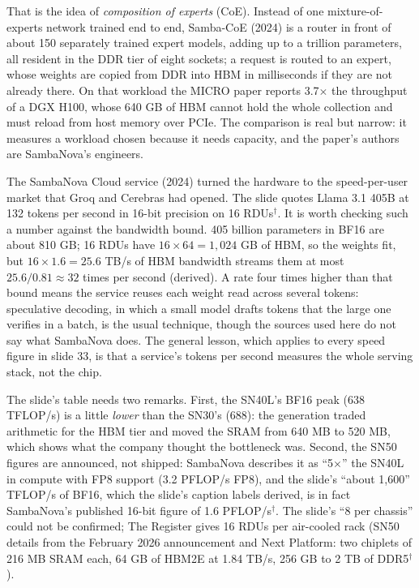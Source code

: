\documentclass[11pt,letterpaper]{article}
\begin{document}
That is the idea of \emph{composition of experts} (CoE). Instead of one mixture-of-experts network trained end to end, Samba-CoE (2024) is a router in front of about 150 separately trained expert models, adding up to a trillion parameters, all resident in the DDR tier of eight sockets; a request is routed to an expert, whose weights are copied from DDR into HBM in milliseconds if they are not already there. On that workload the MICRO paper reports 3.7$\times$ the throughput of a DGX H100, whose 640 GB of HBM cannot hold the whole collection and must reload from host memory over PCIe. The comparison is real but narrow: it measures a workload chosen because it needs capacity, and the paper's authors are SambaNova's engineers.

The SambaNova Cloud service (2024) turned the hardware to the speed-per-user market that Groq and Cerebras had opened. The slide quotes Llama 3.1 405B at 132 tokens per second in 16-bit precision on 16 RDUs$^\dagger$. It is worth checking such a number against the bandwidth bound. 405 billion parameters in BF16 are about 810 GB; 16 RDUs have $16\times 64 = 1{,}024$ GB of HBM, so the weights fit, but $16\times 1.6 = 25.6$ TB/s of HBM bandwidth streams them at most $25.6/0.81\approx 32$ times per second (derived). A rate four times higher than that bound means the service reuses each weight read across several tokens: speculative decoding, in which a small model drafts tokens that the large one verifies in a batch, is the usual technique, though the sources used here do not say what SambaNova does. The general lesson, which applies to every speed figure in slide 33, is that a service's tokens per second measures the whole serving stack, not the chip.

The slide's table needs two remarks. First, the SN40L's BF16 peak (638 TFLOP/s) is a little \emph{lower} than the SN30's (688): the generation traded arithmetic for the HBM tier and moved the SRAM from 640 MB to 520 MB, which shows what the company thought the bottleneck was. Second, the SN50 figures are announced, not shipped: SambaNova describes it as ``5$\times$'' the SN40L in compute with FP8 support (3.2 PFLOP/s FP8), and the slide's ``about 1{,}600'' TFLOP/s of BF16, which the slide's caption labels derived, is in fact SambaNova's published 16-bit figure of 1.6 PFLOP/s$^\dagger$. The slide's ``8 per chassis'' could not be confirmed; The Register gives 16 RDUs per air-cooled rack (SN50 details from the February 2026 announcement and Next Platform: two chiplets of 216 MB SRAM each, 64 GB of HBM2E at 1.84 TB/s, 256 GB to 2 TB of DDR5$^\dagger$).
\end{document}
